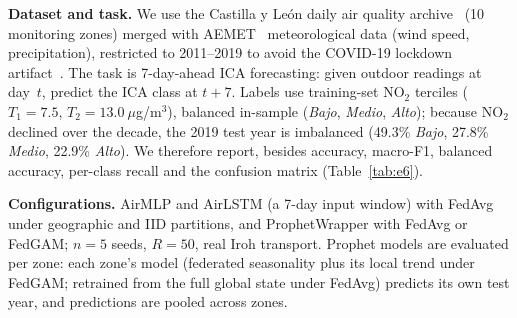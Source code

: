 \textbf{Dataset and task.} We use the Castilla y Le\'on daily air quality archive~\cite{cyl2023airquality} (10 monitoring zones) merged with AEMET~\cite{aemet2023} meteorological data (wind speed, precipitation), restricted to 2011--2019 to avoid the COVID-19 lockdown artifact~\cite{lopezblanco2024airquality}. The task is 7-day-ahead ICA forecasting: given outdoor readings at day~$t$, predict the ICA class at $t{+}7$. Labels use training-set NO$_2$ terciles ($T_1{=}7.5$, $T_2{=}13.0~\mu$g/m$^3$), balanced in-sample (\textit{Bajo}, \textit{Medio}, \textit{Alto}); because NO$_2$ declined over the decade, the 2019 test year is imbalanced (49.3\% \textit{Bajo}, 27.8\% \textit{Medio}, 22.9\% \textit{Alto}). We therefore report, besides accuracy, macro-F1, balanced accuracy, per-class recall and the confusion matrix (Table~\ref{tab:e6}).

\textbf{Configurations.} AirMLP and AirLSTM (a 7-day input window) with FedAvg under geographic and IID partitions, and ProphetWrapper with FedAvg or FedGAM; $n{=}5$ seeds, $R{=}50$, real Iroh transport. Prophet models are evaluated per zone: each zone's model (federated seasonality plus its local trend under FedGAM; retrained from the full global state under FedAvg) predicts its own test year, and predictions are pooled across zones.

